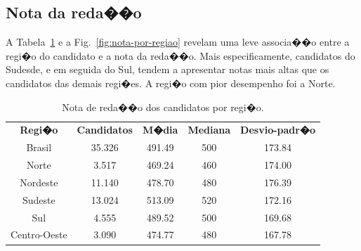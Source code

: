 \documentclass[12pt]{article}
\newcommand{\reffig}[1]{Fig.~\ref{fig:#1}}
\newcommand{\reftab}[1]{Tabela~\ref{tab:#1}}
\begin{document}
\subsection{Nota da reda��o}
A \reftab{nota-por-regiao} e a \reffig{nota-por-regiao} revelam uma leve associa��o entre a regi�o do candidato e a nota da reda��o. Mais especificamente, candidatos do Sudesde, e em seguida do Sul, tendem a apresentar notas mais altas que os candidatos das demais regi�es. A regi�o com pior desempenho foi a Norte.

\begin{minipage}{.5\textwidth}
    \begin{table}[H]
    \begin{tabular}{ c c c c c }
      \textbf{Regi�o}  & \textbf{Candidatos} & \textbf{M�dia} & \textbf{Mediana} & \textbf{Desvio-padr�o} \\
      Brasil           & 35.326              & 491.49          & 500             & 173.84 \\
      Norte            & 3.517               & 469.24          & 460             & 174.00 \\
      Nordeste         & 11.140              & 478.70          & 480             & 176.39 \\
      Sudeste          & 13.024              & 513.09          & 520             & 172.16 \\
      Sul              & 4.555               & 489.52          & 500             & 169.68 \\
      Centro-Oeste     & 3.090               & 474.77          & 480             & 167.78 \\
    \end{tabular}
    \caption{Nota de reda��o dos candidatos por regi�o.}
    \label{tab:nota-por-regiao}
    \end{table}
\end{minipage}%
\end{document}
